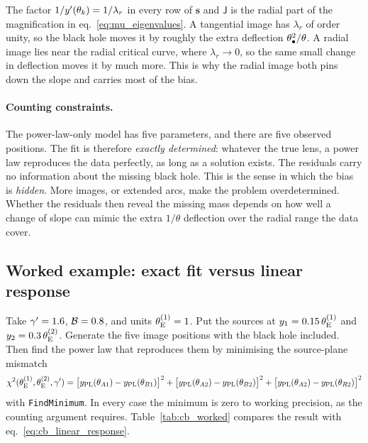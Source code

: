 \begin{bridge}
The factor $1/y'(\theta_k)=1/\lambda_r$ in every row of $\mathbf{s}$
and $\mathsf{J}$ is the radial part of the magnification in
eq.~\eqref{eq:mu_eigenvalues}. A tangential image has $\lambda_r$ of
order unity, so the black hole moves it by roughly the extra deflection
$\theta_{\bullet}^2/\theta$. A radial image lies near the radial critical curve,
where $\lambda_r\to0$, so the same small change in deflection moves it
by much more. This is why the radial image both pins down the slope and
carries most of the bias.
\end{bridge}

\paragraph{Counting constraints.} The power-law-only model has five
parameters, and there are five observed positions. The fit is therefore
\emph{exactly determined}: whatever the true lens, a power law
reproduces the data perfectly, as long as a solution exists. The
residuals carry no information about the missing black hole. This is
the sense in which the bias is \emph{hidden}. More images, or extended
arcs, make the problem overdetermined. Whether the residuals then reveal
the missing mass depends on how well a change of slope can mimic the
extra $1/\theta$ deflection over the radial range the data cover.

\subsection{Worked example: exact fit versus linear response}
\label{sec:cb_worked}

Take $\gamma'=1.6$, $\mathcal{B}=0.8$, and units $\theta_{\mathrm{E}}^{(1)}=1$. Put the
sources at $y_1=0.15\,\theta_{\mathrm{E}}^{(1)}$ and $y_2=0.3\,\theta_{\mathrm{E}}^{(2)}$.
Generate the five image positions with the black hole included. Then
find the power law that reproduces them by minimising the source-plane
mismatch
\[
  \chi^2(\theta_{\mathrm{E}}^{(1)},\theta_{\mathrm{E}}^{(2)},\gamma')=
  \big[y_{\rm PL}(\theta_{A1})-y_{\rm PL}(\theta_{B1})\big]^2
  +\big[y_{\rm PL}(\theta_{A2})-y_{\rm PL}(\theta_{B2})\big]^2
  +\big[y_{\rm PL}(\theta_{A2})-y_{\rm PL}(\theta_{R2})\big]^2
\]
with \texttt{FindMinimum}. In every case the minimum is zero to working
precision, as the counting argument requires. Table~\ref{tab:cb_worked}
compares the result with eq.~\eqref{eq:cb_linear_response}.

